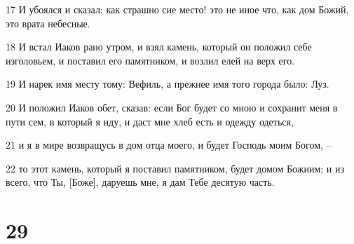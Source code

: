 \par 17 И убоялся и сказал: как страшно сие место! это не иное что, как дом Божий, это врата небесные.
\par 18 И встал Иаков рано утром, и взял камень, который он положил себе изголовьем, и поставил его памятником, и возлил елей на верх его.
\par 19 И нарек имя месту тому: Вефиль, а прежнее имя того города было: Луз.
\par 20 И положил Иаков обет, сказав: если Бог будет со мною и сохранит меня в пути сем, в который я иду, и даст мне хлеб есть и одежду одеться,
\par 21 и я в мире возвращусь в дом отца моего, и будет Господь моим Богом, --
\par 22 то этот камень, который я поставил памятником, будет домом Божиим; и из всего, что Ты, [Боже], даруешь мне, я дам Тебе десятую часть.

\chapter{29}

